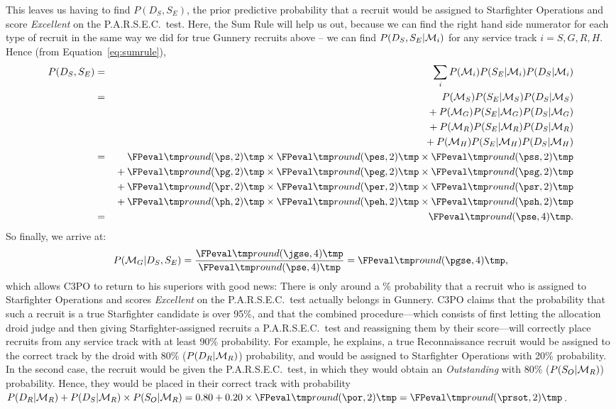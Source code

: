 This leaves us having to find $P(D_S,S_E)$, the prior predictive probability that a recruit would be assigned to Starfighter Operations and score \emph{Excellent} on the P.A.R.S.E.C.\ test. Here, the Sum Rule will help us out, because we can find the right hand side numerator for each type of recruit in the same way we did for true Gunnery recruits above -- we can find $P(D_S,S_E|{\cal M}_i)$ for any service track $i = S, G, R, H$. Hence (from Equation~\ref{eq:sumrule}),
\begin{eqnarray*}
P(D_S,S_E)  &=& \sum_i P(\H_i)P(S_E|\H_i)P(D_S|\H_i) \\
 &=&    P(\H_S)P(S_E|\H_S)P(D_S|\H_S) \\
 && {}+ P(\H_G)P(S_E|\H_G)P(D_S|\H_G)\\
 && {}+ P(\H_R)P(S_E|\H_R)P(D_S|\H_R) \\ 
 && {}+ P(\H_H)P(S_E|\H_H)P(D_S|\H_H)\\
&=&    \print[2]{\ps} \times \print[2]{\pes} \times \print[2]{\pss} \\
&& {}+ \print[2]{\pg} \times \print[2]{\peg} \times \print[2]{\psg} \\
&& {}+ \print[2]{\pr} \times \print[2]{\per} \times \print[2]{\psr} \\
&& {}+ \print[2]{\ph} \times \print[2]{\peh} \times \print[2]{\psh} \\
 &=& \print{\pse}.
\end{eqnarray*}
So finally, we arrive at:
$$P(\H_G|D_S,S_E) = \frac{\print{\jgse}}{\print{\pse}} = \print{\pgse},$$
which allows C3PO to return to his superiors with good news: There is only around a \print[0]{\pgsepct}\% probability that a recruit who is assigned to Starfighter Operations and scores \emph{Excellent} on the P.A.R.S.E.C.\ test actually belongs in Gunnery. C3PO claims that the probability that such a recruit is a true Starfighter candidate is over 95\%, and that the combined procedure---which consists of first letting the allocation droid judge and then giving Starfighter-assigned recruits a P.A.R.S.E.C.\ test and reassigning them by their score---will correctly place recruits from any service track with at least 90\% probability.
%
%
%
%
%
For example, he explains, a true Reconnaissance recruit would be assigned to the correct track by the droid with 80\% ($P(D_R|{\cal M}_R)$) probability, and would be assigned to Starfighter Operations with 20\% probability. In the second case, the recruit would be given the P.A.R.S.E.C.\ test, in which they would obtain an \emph{Outstanding} with 80\% ($P(S_O|{\cal M}_R)$) probability. Hence, they would be placed in their correct track with probability $P(D_R|\H_R) + P(D_S|\H_R) \times P(S_O|\H_R) = 0.80 + 0.20 \times \print[2]{\por} = \print[2]{\prsot}$.


